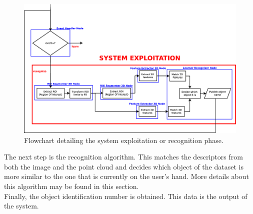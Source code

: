 \begin{figure}[H]
	\begin{center}
\includegraphics[width=\linewidth]{img/diagrams/flowchart3.eps}
	\caption[System exploitation flowchart]{Flowchart detailing the system exploitation or recognition phase.}
		\label{flowchart3}

	\end{center}
\end{figure}



The next step is the recognition algorithm. This matches the descriptors from both the image and the point cloud and decides which object of the dataset is more similar to the one that is currently on the user's hand. More details about this algorithm may be found in this section. 
\\

Finally, the object identification number is obtained. This data is the output of the system. 
